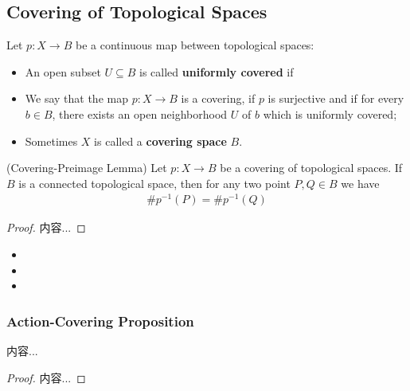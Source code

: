 \documentclass[Total.tex]{subfiles}
\begin{document}
	\subsection{Covering of Topological Spaces}
	\begin{Def}
		Let $p:X\rightarrow B$ be a continuous map between topological spaces:
		\begin{itemize}
			\item An open subset $U\subseteq B$ is called \textbf{uniformly covered} if 
			\item We say that the map $p:X\rightarrow B$ is a covering, if $p$ is surjective and if for every $b\in B$, there exists an open neighborhood $U$ of $b$ which is uniformly covered;
			\item Sometimes $X$ is called a \textbf{covering space} $B$.
		\end{itemize}
	\end{Def}
	\begin{lemma}
		(Covering-Preimage Lemma) Let $p:X\rightarrow B$ be a covering of topological spaces. If $B$ is a connected topological space, then for any two point $P,Q\in B$ we have
		\begin{gather*}
			\#p^{-1}(P)=\#p^{-1}(Q)
		\end{gather*}
	\end{lemma}
	\begin{proof}
		内容...
	\end{proof}
	
	\begin{Def}
		\begin{itemize}
			\item 
			\item 
			\item 
		\end{itemize}
	\end{Def}
	\subsubsection{Action-Covering Proposition}
	\begin{proposition}
		内容...
	\end{proposition}
	\begin{proof}
		内容...
	\end{proof}
\end{document}
